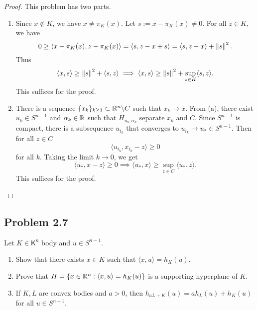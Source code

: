 \documentclass[12pt]{article}
\begin{document}
\begin{proof}
	This problem has two parts. 
	\begin{enumerate}[label = (\alph*)]
		\item Since $x \notin K$, we have $x \neq \pi_K(x)$. Let $s := x - \pi_K(x) \neq 0$. For all $z \in K$, we have 
		\[
			0 \geq \langle x - \pi_K(x), z - \pi_K(x) \rangle = \langle s, z - x + s \rangle = \langle s, z - x \rangle + \left\lVert s\right\rVert^2.
		\]
		Thus
		\[
			\langle x, s \rangle \geq \left\lVert s\right\rVert^2 + \langle s, z \rangle \implies \langle x, s \rangle \geq \left\lVert s\right\rVert^2 + \sup_{z \in K} \langle s, z \rangle.
		\]
		This suffices for the proof. 
		\item There is a sequence $\{x_k\}_{k \geq 1} \subset \mathbb{R}^n \backslash C$ such that $x_k \to x$. From (a), there exist $u_k \in S^{n-1}$ and $\alpha_k \in \mathbb{R}$ such that $H_{u_k, \alpha_k}$ separate $x_k$ and $C$. Since $S^{n-1}$ is compact, there is a subsequence $u_{i_k}$ that converges to $u_{i_k} \to u_* \in S^{n-1}$. Then for all $z \in C$
		\[
			\langle u_{i_k}, x_{i_k} - z \rangle \geq 0
		\]
		for all $k$. Taking the limit $k \to 0$, we get 
		\[
			\langle u_*, x - z \rangle \geq 0 \implies \langle u_*, x \rangle \geq \sup_{z \in C} \langle u_*, z \rangle.
		\]
		This suffices for the proof. 
	\end{enumerate}
\end{proof}

\newpage 

\subsection{Problem 2.7}

\begin{problem}
	Let $K \in \mathsf{K}^n$ body and $u \in S^{n-1}$.
    \begin{enumerate}[label = (\alph*)]
        \item Show that there exists $x \in K$ such that $\langle x, u \rangle = h_K(u)$. 
        \item Prove that $H = \{x \in \mathbb{R}^n : \langle x, u \rangle = h_K(u)\}$ is a supporting hyperplane of $K$.
        \item If $K, L$ are convex bodies and $a > 0$, then $h_{aL + K} (u) = a h_L(u) + h_K(u)$ for all $u \in S^{n-1}$.
    \end{enumerate}
\end{problem}
\end{document}
